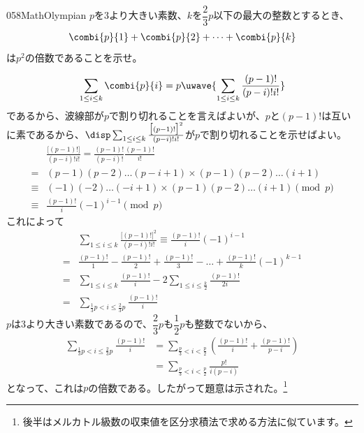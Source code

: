 \begin{prob}{058}{}{MathOlympian}
 $p$を3より大きい素数、$k$を$\dfrac{2}{3}p$以下の最大の整数とするとき、
 \begin{align*}
  \combi{p}{1}+\combi{p}{2}+\dots+\combi{p}{k}
 \end{align*}
 は$p^2$の倍数であることを示せ。
\end{prob}
\[ \sum_{1\le i\le k} \combi{p}{i}=p\uwave{\sum_{1\le i\le k}\frac{(p-1)!}{(p-i)! i!}} \]
であるから、波線部が$p$で割り切れることを言えばよいが、$p$と$(p-1)!$は互いに素であるから、$\disp \sum_{1\le i\le k}\frac{\bigl[(p-1)!\bigr]^2}{(p-i)! i!}$が$p$で割り切れることを示せばよい。
\begin{align*}
 &\frac{\bigl[(p-1)!\bigr]}{(p-i)! i!}=\frac{(p-1)!}{(p-i)!}\frac{(p-1)!}{i!} \\
 =& (p-1)(p-2)\dots(p-i+1)\times(p-1)(p-2)\dots(i+1) \\
 \equiv & (-1)(-2)\dots(-i+1)\times(p-1)(p-2)\dots(i+1) \pmod{p} \\
 \equiv & \frac{(p-1)!}{i}(-1)^{i-1} \pmod{p}
\end{align*}
これによって
\begin{align*}
 &\sum_{1\le i\le k} \frac{\bigl[(p-1)!\bigr]^2}{(p-i)! i!}\equiv \frac{(p-1)!}{i}(-1)^{i-1} \\
 =& \frac{(p-1)!}{1}-\frac{(p-1)!}{2}+\frac{(p-1)!}{3}-\dots+\frac{(p-1)!}{k}(-1)^{k-1} \\
 =& \sum_{1\le i\le k} \frac{(p-1)!}{i} - 2\sum_{1\le i\le \frac{k}{2}}\frac{(p-1)!}{2i} \\
 =& \sum_{\frac{1}{3}p< i\le \frac{2}{3}p} \frac{(p-1)!}{i}
\end{align*}
$p$は3より大きい素数であるので、$\dfrac{2}{3}p$も$\dfrac{1}{2}p$も整数でないから、
\begin{align*}
 \sum_{\frac{1}{3}p< i\le \frac{2}{3}p} \frac{(p-1)!}{i} &= \sum_{\frac{p}{3}<i<\frac{p}{2}}\left(\frac{(p-1)!}{i}+\frac{(p-1)!}{p-i}\right) \\
 &= \sum_{\frac{p}{3}<i<\frac{p}{2}} \frac{p!}{i(p-i)}
\end{align*}
となって、これは$p$の倍数である。したがって題意は示された。\footnote{後半はメルカトル級数の収束値を区分求積法で求める方法に似ています。}